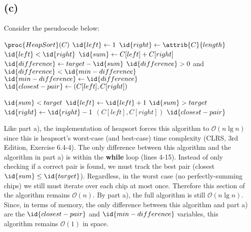     \subsection{(c)}
    Consider the pseudocode below:
    \begin{spacing}{1.2}
    \begin{codebox}
        \li $\proc{HeapSort}(C)$
        \li $\id{left} \gets 1$
        \li $\id{right} \gets \attrib{C}{length}$
        \li \While $\id{left} < \id{right}$
            \Do
                \li $\id{sum} \gets C[left] + C[right]$
                \li $\id{difference} \gets target - \id{sum}$
                \li \If $\id{difference} > 0$ and $\id{difference} < \id{min-difference}$
                \Then
                    \li $\id{min-difference} \gets \id{difference}$
                    \li $\id{closest-pair} \gets (C[left], C[right])$
                \End

                \li \If $\id{sum} < target$
                \Then
                    \li $\id{left} \gets \id{left} + 1$
                \li \ElseIf $\id{sum} > target$
                \Then
                    \li $\id{right} \gets \id{right} - 1$
                \li \ElseNoIf
                    \li \Return $(C[left], C[right])$
                \End 
            \End
        \li \Return $\id{closest-pair}$
    \end{codebox}
    \end{spacing}
    \vspace{5mm}
    Like part a), the implementation of heapsort forces this algorithm to $\mathcal{O}(n\lg{n})$ since this is heapsort's worst-case (and best-case) time complexity (CLRS, 3rd Edition, Exercise 6.4-4).
    The only difference between this algorithm and the algorithm in part a) is within the \textbf{while} loop (lines 4-15).
    Instead of only checking if a correct pair is found, we must track the best pair (closest $\id{sum} \le \id{target}$).
    Regardless, in the worst case (no perfectly-summing chips) we still must iterate over each chip at most once.
    Therefore this section of the algorithm remains $\mathcal{O}(n)$.
    By part a), the full algorithm is still $\mathcal{O}(n\lg{n})$. \\

    Since, in terms of memory, the only difference between this algorithm and part a) are the $\id{closest-pair}$ and $\id{min-difference}$ variables, this algorithm remains $\mathcal{O}(1)$ in space. \\

